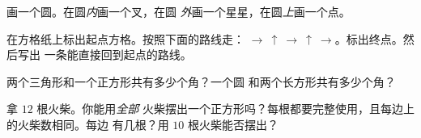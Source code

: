 \begin{exercise}[$\star$]\label{exo:g1:shapes:6}
画一个圆。在圆\emph{内}画一个叉，在圆
\emph{外}画一个星星，在圆\emph{上}画一个点。
\end{exercise}

\begin{exercise}[$\star$]\label{exo:g1:shapes:7}
在方格纸上标出起点方格。按照下面的路线走：
$\to\ \uparrow\ \to\ \uparrow\ \to$。标出终点。然后写出
一条能直接回到起点的路线。
\end{exercise}

\begin{exercise}[$\star$]\label{exo:g1:shapes:8}
两个三角形和一个正方形共有多少个角？一个圆
和两个长方形共有多少个角？
\end{exercise}

\begin{exercise}[$\star\star$]\label{exo:g1:shapes:9}
拿 $12$ 根火柴。你能用\emph{全部}
火柴摆出一个正方形吗？每根都要完整使用，且每边上的火柴数相同。每边
有几根？用 $10$ 根火柴能否摆出？
\end{exercise}
